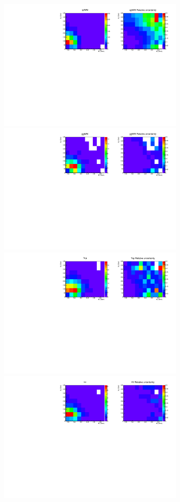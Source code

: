 \begin{figure}[htp]
\centering
\includegraphics[width=0.8\textwidth]{figures/2dtemplate_qqWW_mH400_0j.pdf}
\includegraphics[width=0.8\textwidth]{figures/2dtemplate_ggWW_mH400_0j.pdf}
\includegraphics[width=0.8\textwidth]{figures/2dtemplate_Top_mH400_0j.pdf}
\includegraphics[width=0.8\textwidth]{figures/2dtemplate_VV_mH400_0j.pdf}

\end{figure}
